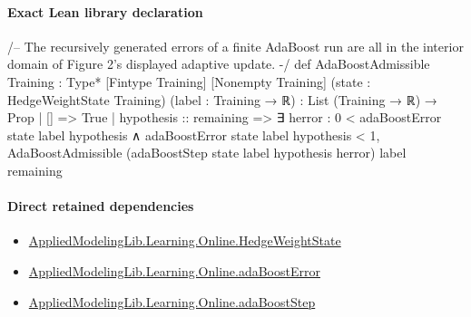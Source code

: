 \documentclass[10pt]{article}
\begin{document}
\paragraph{Exact Lean library declaration}
\begin{ReviewVerbatim}
/--
The recursively generated errors of a finite AdaBoost run are all in the
interior domain of Figure 2's displayed adaptive update.
-/
def AdaBoostAdmissible
    {Training : Type*} [Fintype Training] [Nonempty Training]
    (state : HedgeWeightState Training) (label : Training → ℝ) :
    List (Training → ℝ) → Prop
  | [] => True
  | hypothesis :: remaining =>
      ∃ herror : 0 < adaBoostError state label hypothesis ∧
          adaBoostError state label hypothesis < 1,
        AdaBoostAdmissible (adaBoostStep state label hypothesis herror) label remaining
\end{ReviewVerbatim}

\paragraph{Direct retained dependencies}
\begin{itemize}\raggedright
\item \hyperlink{library-prerequisite-8196082d02788389}{Applied\allowbreak{}Modeling\allowbreak{}Lib.\allowbreak{}Learning.\allowbreak{}Online.\allowbreak{}Hedge\allowbreak{}Weight\allowbreak{}State}
\item \hyperlink{governing-declaration-bd631eacbec4687c}{Applied\allowbreak{}Modeling\allowbreak{}Lib.\allowbreak{}Learning.\allowbreak{}Online.\allowbreak{}ada\allowbreak{}Boost\allowbreak{}Error}
\item \hyperlink{governing-declaration-ab9e0307acbbe7ff}{Applied\allowbreak{}Modeling\allowbreak{}Lib.\allowbreak{}Learning.\allowbreak{}Online.\allowbreak{}ada\allowbreak{}Boost\allowbreak{}Step}
\end{itemize}
\end{document}

